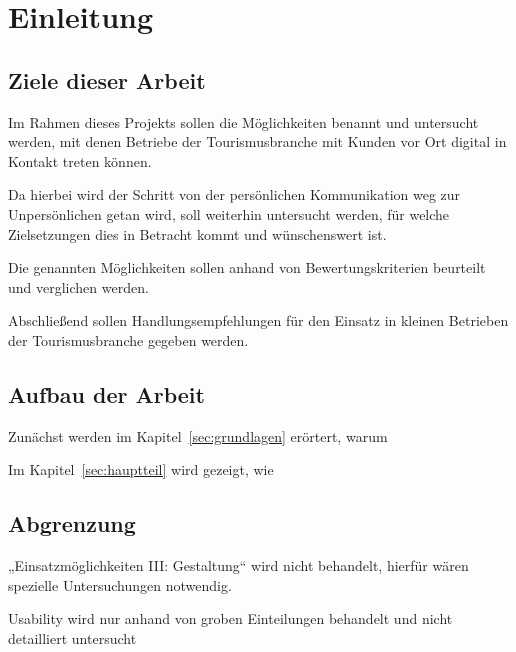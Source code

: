 \section{Einleitung}
\label{sec:einleitung}


\subsection{Ziele dieser Arbeit}

Im Rahmen dieses Projekts sollen die Möglichkeiten benannt und untersucht werden, mit denen Betriebe der Tourismusbranche mit Kunden vor Ort digital in Kontakt treten können. 

Da hierbei wird der Schritt von der persönlichen Kommunikation weg zur Unpersönlichen getan wird, soll weiterhin untersucht werden, für welche Zielsetzungen dies in Betracht kommt und wünschenswert ist.

Die genannten Möglichkeiten sollen anhand von Bewertungskriterien beurteilt und verglichen werden.

Abschließend sollen Handlungsempfehlungen für den Einsatz in kleinen Betrieben der Tourismusbranche gegeben werden.


\subsection{Aufbau der Arbeit}

Zunächst werden im Kapitel~\ref{sec:grundlagen} erörtert, warum 

Im Kapitel~\ref{sec:hauptteil} wird gezeigt, wie 

\subsection{Abgrenzung}

„Einsatzmöglichkeiten III: Gestaltung“ wird nicht behandelt, hierfür wären spezielle Untersuchungen notwendig.

Usability wird nur anhand von groben Einteilungen behandelt und nicht detailliert untersucht